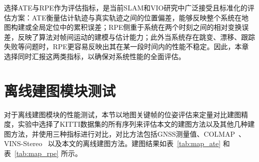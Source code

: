 选择ATE与RPE作为评估指标，是当前SLAM和VIO研究中广泛接受且标准化的评估方案：ATE衡量估计轨迹与真实轨迹之间的位置偏差，能够反映整个系统在地图构建或全局定位中的累积误差；RPE侧重于系统在两个时刻之间的相对变换误差，反映了算法对帧间运动的建模与估计能力；此外当系统存在跳变、漂移、跟踪失败等问题时，RPE更容易反映出其在某一段时间内的性能不稳定。因此，本章选择同时汇报这两类指标，以确保对系统性能的全面评估。



\section{离线建图模块测试}
对于离线建图模块的性能测试，本节以地图关键帧的位姿评估来定量对比建图精度，实验中选择了KITTI数据集的所有序列来评估本文的建图方法以及其他几种建图方法，并使用三种指标进行对比，对比方法包括GNSS测量值、COLMAP~\cite{schonberger2016structure}、VINS-Stereo~\cite{qin2019a} 以及本文的离线建图方法。建图结果如表~\ref{tab:map_ate} 和表~\ref{tab:map_rpe} 所示。

